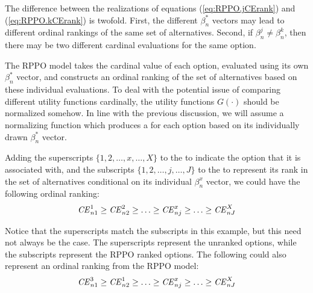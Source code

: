 The difference between the realizations of equations (\ref{eq:RPPO.jCErank}) and (\ref{eq:RPPO.kCErank}) is twofold.
First, the different $\beta_n^*$ vectors may lead to different ordinal rankings of the same set of alternatives.
Second, if $\beta_n^j \neq \beta_n^k$, then there may be two different cardinal evaluations for the same option.

The RPPO model takes the cardinal value of each option, evaluated using its own $\beta_n^*$  vector, and constructs an ordinal ranking of the set of alternatives based on these individual evaluations.
To deal with the potential issue of comparing different utility functions cardinally, the utility functions $G(\cdot)$ should be normalized somehow.{\footnotemark}
In line with the previous discussion, we will assume a normalizing function which produces a {\CE} for each option based on its individually drawn $\beta_n^*$ vector.

\addtocounter{footnote}{-1}

Adding the superscripts $\{1,2,\ldots,x,\ldots,X\}$  to the {\CE} to indicate the option that it is associated with, and the subscripts $\{1,2,\ldots,j,\ldots,J\}$ to the {\CE} to represent its rank in the set of alternatives conditional on its individual $\beta_n^x$ vector, we could have the following ordinal ranking:
\begin{equation}
	\label{eq:RPPO.CErank.f}
	{\ensuremath{\mathit{CE}}}^1_{n1} \geq {\ensuremath{\mathit{CE}}}^2_{n2} \geq \ldots \geq {\ensuremath{\mathit{CE}}}^x_{nj} \geq \ldots \geq {\ensuremath{\mathit{CE}}}^X_{nJ}
\end{equation}

Notice that the superscripts match the subscripts in this example, but this need not always be the case.
The superscripts represent the unranked options, while the subscripts represent the RPPO ranked options.
The following could also represent an ordinal ranking from the RPPO model:
\begin{equation}
	\label{eq:RPPO.CErank.a}
	{\ensuremath{\mathit{CE}}}^3_{n1} \geq {\ensuremath{\mathit{CE}}}^1_{n2} \geq \ldots \geq {\ensuremath{\mathit{CE}}}^x_{nj} \geq \ldots \geq {\ensuremath{\mathit{CE}}}^X_{nJ}
\end{equation}

